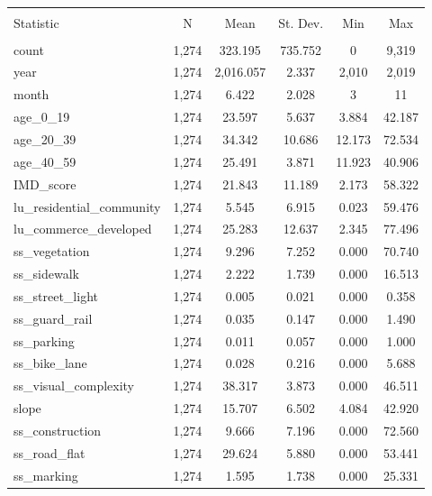 
\begin{table}[!htbp] \centering 
  \caption{} 
  \label{} 
\begin{tabular}{@{\extracolsep{5pt}}lccccc} 
\\[-1.8ex]\hline 
\hline \\[-1.8ex] 
Statistic & \multicolumn{1}{c}{N} & \multicolumn{1}{c}{Mean} & \multicolumn{1}{c}{St. Dev.} & \multicolumn{1}{c}{Min} & \multicolumn{1}{c}{Max} \\ 
\hline \\[-1.8ex] 
count & 1,274 & 323.195 & 735.752 & 0 & 9,319 \\ 
year & 1,274 & 2,016.057 & 2.337 & 2,010 & 2,019 \\ 
month & 1,274 & 6.422 & 2.028 & 3 & 11 \\ 
age\_0\_19 & 1,274 & 23.597 & 5.637 & 3.884 & 42.187 \\ 
age\_20\_39 & 1,274 & 34.342 & 10.686 & 12.173 & 72.534 \\ 
age\_40\_59 & 1,274 & 25.491 & 3.871 & 11.923 & 40.906 \\ 
IMD\_score & 1,274 & 21.843 & 11.189 & 2.173 & 58.322 \\ 
lu\_residential\_community & 1,274 & 5.545 & 6.915 & 0.023 & 59.476 \\ 
lu\_commerce\_developed & 1,274 & 25.283 & 12.637 & 2.345 & 77.496 \\ 
ss\_vegetation & 1,274 & 9.296 & 7.252 & 0.000 & 70.740 \\ 
ss\_sidewalk & 1,274 & 2.222 & 1.739 & 0.000 & 16.513 \\ 
ss\_street\_light & 1,274 & 0.005 & 0.021 & 0.000 & 0.358 \\ 
ss\_guard\_rail & 1,274 & 0.035 & 0.147 & 0.000 & 1.490 \\ 
ss\_parking & 1,274 & 0.011 & 0.057 & 0.000 & 1.000 \\ 
ss\_bike\_lane & 1,274 & 0.028 & 0.216 & 0.000 & 5.688 \\ 
ss\_visual\_complexity & 1,274 & 38.317 & 3.873 & 0.000 & 46.511 \\ 
slope & 1,274 & 15.707 & 6.502 & 4.084 & 42.920 \\ 
ss\_construction & 1,274 & 9.666 & 7.196 & 0.000 & 72.560 \\ 
ss\_road\_flat & 1,274 & 29.624 & 5.880 & 0.000 & 53.441 \\ 
ss\_marking & 1,274 & 1.595 & 1.738 & 0.000 & 25.331 \\ 

\end{tabular}
\end{table}
